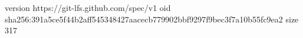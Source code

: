 version https://git-lfs.github.com/spec/v1
oid sha256:391a5ce5f44b2aff545348427aacecb779902bbf9297f9bec3f7a10b55fc9ea2
size 317
